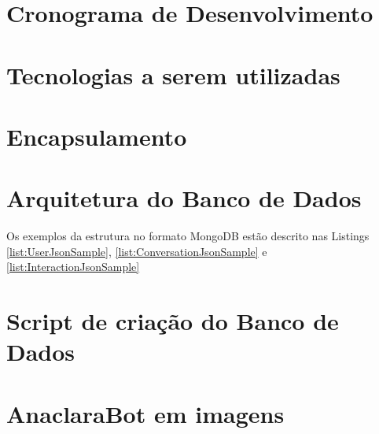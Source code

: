 \documentclass[12pt]{report}
\begin{document}


\section*{Cronograma de Desenvolvimento}



\newpage
\section*{Tecnologias a serem utilizadas}



\section*{Encapsulamento}




\newpage
\section*{Arquitetura do Banco de Dados}
\setlength{\parindent}{10ex}



\newpage
\par Os exemplos da estrutura no formato MongoDB estão descrito nas Listings \ref{list:UserJsonSample}, \ref{list:ConversationJsonSample} e \ref{list:InteractionJsonSample}



\newpage
\section*{Script de criação do Banco de Dados}
\setlength{\parindent}{10ex}



\newpage
\section*{AnaclaraBot em imagens}
\setlength{\parindent}{10ex}

\end{document}
